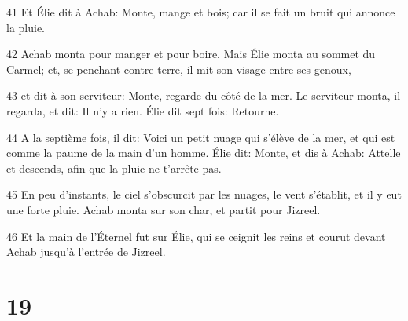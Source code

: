 \par 41 Et Élie dit à Achab: Monte, mange et bois; car il se fait un bruit qui annonce la pluie.
\par 42 Achab monta pour manger et pour boire. Mais Élie monta au sommet du Carmel; et, se penchant contre terre, il mit son visage entre ses genoux,
\par 43 et dit à son serviteur: Monte, regarde du côté de la mer. Le serviteur monta, il regarda, et dit: Il n'y a rien. Élie dit sept fois: Retourne.
\par 44 A la septième fois, il dit: Voici un petit nuage qui s'élève de la mer, et qui est comme la paume de la main d'un homme. Élie dit: Monte, et dis à Achab: Attelle et descends, afin que la pluie ne t'arrête pas.
\par 45 En peu d'instants, le ciel s'obscurcit par les nuages, le vent s'établit, et il y eut une forte pluie. Achab monta sur son char, et partit pour Jizreel.
\par 46 Et la main de l'Éternel fut sur Élie, qui se ceignit les reins et courut devant Achab jusqu'à l'entrée de Jizreel.

\chapter{19}


